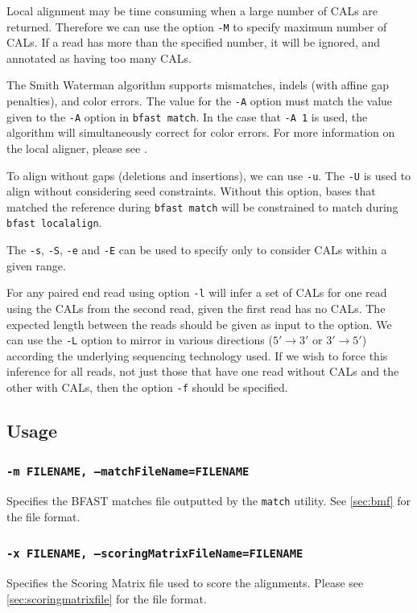 \documentclass[a4paper,12pt]{book}
\newcommand{\TT}[1]{{\tt #1}} %
\newcommand{\BMF}{BFAST matches file} %
\begin{document}
Local alignment may be time consuming when a large number of CALs are returned.
Therefore we can use the option \TT{-M} to specify maximum number of CALs.
If a read has more than the specified number, it will be ignored, and annotated as having too many CALs.


The Smith Waterman algorithm supports mismatches, indels (with affine gap penalties), and color errors.
The value for the \TT{-A} option must match the value given to the \TT{-A} option in \TT{bfast match}.
In the case that \TT{-A 1} is used, the algorithm will simultaneously correct for color errors.
For more information on the local aligner, please see \cite{BFAST-local-alignment}.

To align without gaps (deletions and insertions), we can use \TT{-u}.
The \TT{-U} is used to align without considering seed constraints.  
Without this option, bases that matched the reference during \TT{bfast match} will be constrained to match during \TT{bfast localalign}.

The \TT{-s}, \TT{-S}, \TT{-e} and \TT{-E} can be used to specify only to consider CALs within a given range.

For any paired end read using option \TT{-l} will infer a set of CALs for one read using the CALs from the second read, given the first read has no CALs.
The expected length between the reads should be given as input to the option.
We can use the \TT{-L} option to mirror in various directions ($5'\rightarrow 3'$ or $3'\rightarrow 5'$) according the underlying sequencing technology used. 
If we wish to force this inference for all reads, not just those that have one read without CALs and the other with CALs, then the option \TT{-f} should be specified.

\subsection{Usage}
\subsubsection{\TT{-m FILENAME, --matchFileName=FILENAME}}
Specifies the \BMF{} outputted by the \TT{match} utility.
See \autoref{sec:bmf} for the file format.

\subsubsection{\TT{-x FILENAME, --scoringMatrixFileName=FILENAME}}
Specifies the Scoring Matrix file used to score the alignments.
Please see \autoref{sec:scoringmatrixfile} for the file format.
\end{document}

